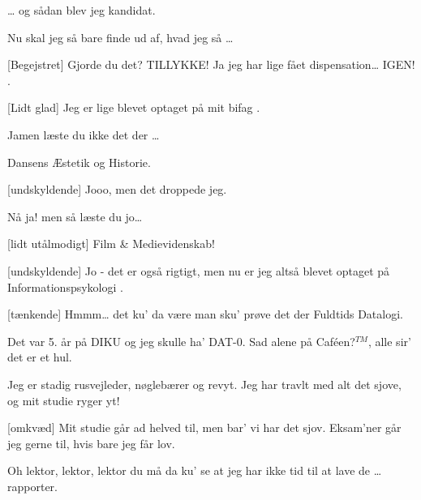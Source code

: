 \documentclass[a4paper]{article}
\begin{document}
\begin{sketch}
   \ldots{} og sådan blev jeg kandidat. 

   Nu skal jeg så bare  finde ud af, hvad
  jeg så \ldots
  
  [Begejstret] Gjorde du det? TILLYKKE! Ja jeg har lige fået
  dispensation\ldots{}  IGEN!
  .

  [Lidt glad] Jeg er lige blevet optaget på mit bifag
  .
  
   Jamen læste du ikke  det der
  \ldots{} 

   Dansens Æstetik og Historie.

  [undskyldende] Jooo, men det droppede jeg.

   Nå ja! men så læste du jo\ldots{} 

  [lidt utålmodigt] Film \& Medievidenskab!

  [undskyldende] Jo - det er også rigtigt, men nu er jeg
  altså blevet optaget på Informationspsykologi .

  [tænkende]  Hmmm\ldots{} det ku' da være man sku' prøve det der
  Fuldtids Datalogi. 
\end{sketch}


\begin{song}
  Det var 5. år på DIKU og jeg skulle ha' DAT-0.
  Sad alene på Caf\'een?$^{TM}$, alle sir' det er et hul.

  Jeg er stadig rusvejleder, nøglebærer og revyt.
  Jeg har travlt med alt det sjove, og mit studie ryger yt!

  [omkvæd]
  Mit studie går ad helved til, men bar' vi har det sjov.
  Eksam'ner går jeg gerne til, hvis bare jeg får lov.
  
  Oh lektor, lektor, lektor du må da ku' se
  at jeg har ikke tid
  til at lave de \ldots rapporter.
\end{song}

\end{document}
